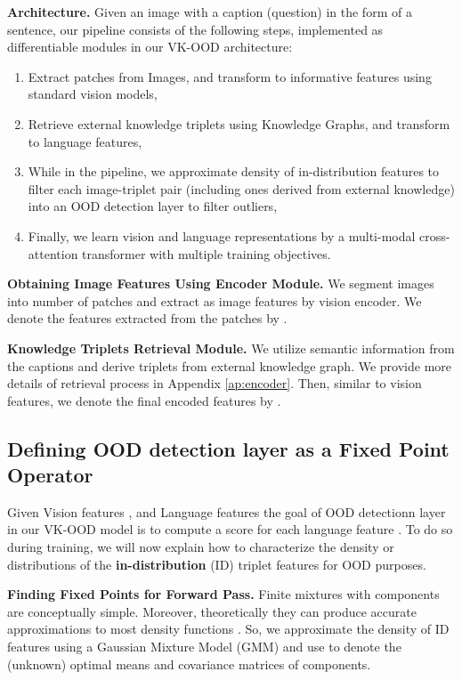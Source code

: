 \documentclass{article}
\begin{document}
\textbf{Architecture.} Given an image  with a caption (question)  in the form of a sentence, our pipeline consists of the following steps, implemented as differentiable modules in our VK-OOD architecture:
\begin{enumerate}
\item Extract patches from Images, and transform to  informative features using standard vision models,
\item Retrieve external knowledge triplets using Knowledge Graphs, and transform to language features,
\item While in the pipeline, we approximate density of in-distribution features to filter each image-triplet pair (including ones derived from external knowledge) into an OOD detection layer to filter outliers,
\item Finally, we learn vision and language representations by a multi-modal cross-attention transformer with multiple training objectives.
\end{enumerate} 


\textbf{Obtaining Image Features Using Encoder Module. } We segment  images into  number of patches and extract  as image features by vision encoder. We denote the features extracted from the patches by .

\textbf{Knowledge Triplets Retrieval Module. } We utilize semantic information from the captions and derive triplets from external knowledge graph. We provide more details of retrieval process in Appendix \ref{ap:encoder}. Then, similar to vision features, we denote the final encoded features by .





\subsection{Defining OOD detection layer as a Fixed Point Operator} Given Vision features , and Language features  the goal of OOD detectionn layer in our VK-OOD model is to compute a score  for each language feature . To do so during training, we will now explain how to characterize the  density or distributions  of the {\bf in-distribution} (ID) triplet features for OOD purposes. 

{\bf Finding Fixed Points for Forward Pass.} Finite mixtures with  components are conceptually simple. Moreover, theoretically they can produce accurate
approximations to most density functions \cite{mclachlan2019finite}. So, we approximate the density of ID features using a Gaussian Mixture Model (GMM) and use  to denote the (unknown) optimal means and covariance matrices of  components. 
\end{document}
